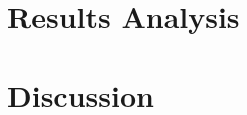 \documentclass[final_report_innit.tex]{subfiles}
\begin{document}
\section{Results Analysis}

\section{Discussion}
\end{document}
